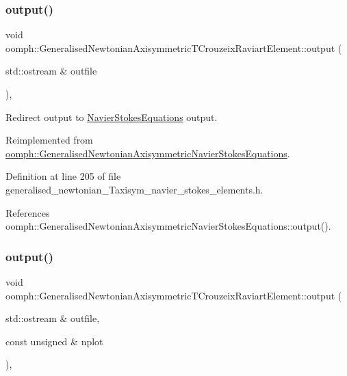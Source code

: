 \subsubsection{\texorpdfstring{output()}{output()}\hspace{0.1cm}{\footnotesize\ttfamily [1/4]}}
{\footnotesize\ttfamily void oomph\+::\+Generalised\+Newtonian\+Axisymmetric\+T\+Crouzeix\+Raviart\+Element\+::output (\begin{DoxyParamCaption}\item[{std\+::ostream \&}]{outfile }\end{DoxyParamCaption})\hspace{0.3cm}{\ttfamily [inline]}, {\ttfamily [virtual]}}



Redirect output to \hyperlink{classoomph_1_1NavierStokesEquations}{Navier\+Stokes\+Equations} output. 



Reimplemented from \hyperlink{classoomph_1_1GeneralisedNewtonianAxisymmetricNavierStokesEquations_a25e906f89c3cec75081bd2fc88b37fd5}{oomph\+::\+Generalised\+Newtonian\+Axisymmetric\+Navier\+Stokes\+Equations}.



Definition at line 205 of file generalised\+\_\+newtonian\+\_\+\+Taxisym\+\_\+navier\+\_\+stokes\+\_\+elements.\+h.



References oomph\+::\+Generalised\+Newtonian\+Axisymmetric\+Navier\+Stokes\+Equations\+::output().

\mbox{\label{classoomph_1_1GeneralisedNewtonianAxisymmetricTCrouzeixRaviartElement_a645fbf96a334ee860b036dfd24858651}} 
\subsubsection{\texorpdfstring{output()}{output()}\hspace{0.1cm}{\footnotesize\ttfamily [2/4]}}
{\footnotesize\ttfamily void oomph\+::\+Generalised\+Newtonian\+Axisymmetric\+T\+Crouzeix\+Raviart\+Element\+::output (\begin{DoxyParamCaption}\item[{std\+::ostream \&}]{outfile,  }\item[{const unsigned \&}]{nplot }\end{DoxyParamCaption})\hspace{0.3cm}{\ttfamily [inline]}, {\ttfamily [virtual]}}



